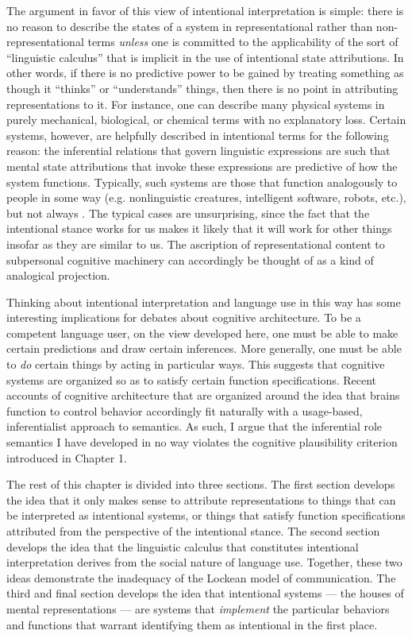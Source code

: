 The argument in favor of this view of intentional interpretation is simple: there is no reason to describe the states of a system in representational rather than non-representational terms \textit{unless} one is committed to the applicability of the sort of ``linguistic calculus'' that is implicit in the use of intentional state attributions. In other words, if there is no predictive power to be gained by treating something as though it ``thinks'' or ``understands'' things, then there is no point in attributing representations to it. For instance, one can describe many physical systems in purely mechanical, biological, or chemical terms with no explanatory loss. Certain systems, however, are helpfully described in intentional terms for the following reason: the inferential relations that govern linguistic expressions are such that mental state attributions that invoke these expressions are predictive of how the system functions. Typically, such systems are those that function analogously to people in some way (e.g. nonlinguistic creatures, intelligent software, robots, etc.), but not always \citep[][]{Hochstein:2011}. The typical cases are unsurprising, since the fact that the intentional stance works for us makes it likely that it will work for other things insofar as they are similar to us. The ascription of representational content to subpersonal cognitive machinery can accordingly be thought of as a kind of analogical projection. 

Thinking about intentional interpretation and language use in this way has some interesting implications for debates about cognitive architecture. To be a competent language user, on the view developed here, one must be able to make certain predictions and draw certain inferences. More generally, one must be able to \textit{do} certain things by acting in particular ways. This suggests that cognitive systems are organized so as to satisfy certain function specifications. Recent accounts of cognitive architecture that are organized around the idea that brains function to control behavior \citep[e.g.][]{Eliasmith:2003} accordingly fit naturally with a usage-based, inferentialist approach to semantics. As such, I argue that the inferential role semantics I have developed in no way violates the cognitive plausibility criterion introduced in Chapter 1.  

The rest of this chapter is divided into three sections. The first section develops the idea that it only makes sense to attribute representations to things that can be interpreted as intentional systems, or things that satisfy function specifications attributed from the perspective of the intentional stance. The second section develops the idea that the linguistic calculus that constitutes intentional interpretation derives from the social nature of language use. Together, these two ideas demonstrate the inadequacy of the Lockean model of communication. The third and final section develops the idea that intentional systems --- the houses of mental representations --- are systems that \textit{implement} the particular behaviors and functions that warrant identifying them as intentional in the first place.    

